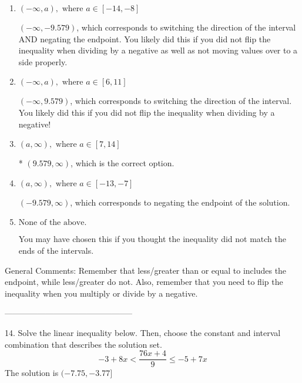 \documentclass{article}[14pt]
\begin{document}
\begin{enumerate}[label=\Alph*.] 
\item $ (-\infty, a), \text{ where } a \in [-14, -8] $ 

  $(-\infty, -9.579)$, which corresponds to switching the direction of the interval AND negating the endpoint. You likely did this if you did not flip the inequality when dividing by a negative as well as not moving values over to a side properly. 
\item $ (-\infty, a), \text{ where } a \in [6, 11] $ 

  $(-\infty, 9.579)$, which corresponds to switching the direction of the interval. You likely did this if you did not flip the inequality when dividing by a negative! 
\item $ (a, \infty), \text{ where } a \in [7, 14] $ 

 * $(9.579, \infty)$, which is the correct option. 
\item $ (a, \infty), \text{ where } a \in [-13, -7] $ 

  $(-9.579, \infty)$, which corresponds to negating the endpoint of the solution. 
\item $ \text{None of the above}. $ 

 You may have chosen this if you thought the inequality did not match the ends of the intervals. 
\end{enumerate} 
 
General Comments: Remember that less/greater than or equal to includes the endpoint, while less/greater do not. Also, remember that you need to flip the inequality when you multiply or divide by a negative.

-----------------------------------------------

14. Solve the linear inequality below. Then, choose the constant and interval combination that describes the solution set.
$$ -3 + 8 x < \frac{76 x + 4}{9} \leq -5 + 7 x $$ 
The solution is $ (-7.75, -3.77] $ 
\end{document}

